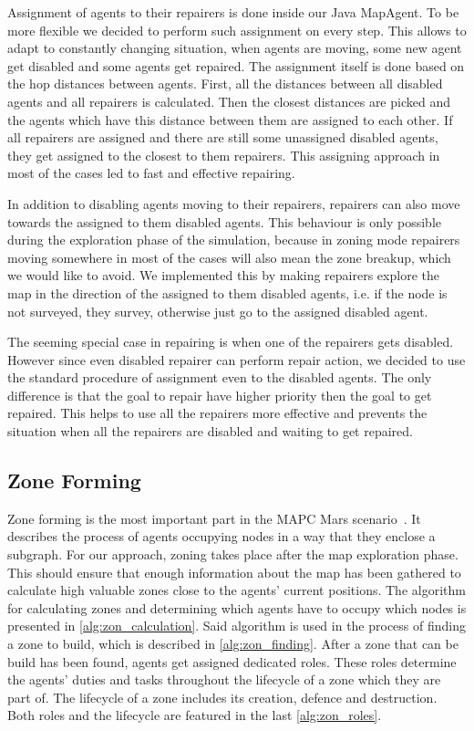 Assignment of agents to their repairers is done inside our Java MapAgent. To be more flexible we decided to perform such assignment on every step. This allows to adapt to constantly changing situation, when agents are moving, some new agent get disabled and some agents get repaired. The assignment itself is done based on the hop distances between agents. First, all the distances between all disabled agents and all repairers is calculated. Then the closest distances are picked and the agents which have this distance between them are assigned to each other. If all repairers are assigned and there are still some unassigned disabled agents, they get assigned to the closest to them repairers. This assigning approach in most of the cases led to fast and effective repairing.

In addition to disabling agents moving to their repairers, repairers can also move towards the assigned to them disabled agents. This behaviour is only possible during the exploration phase of the simulation, because in zoning mode repairers moving somewhere in most of the cases will also mean the zone breakup, which we would like to avoid. We implemented this by making repairers explore the map in the direction of the assigned to them disabled agents, i.e. if the node is not surveyed, they survey, otherwise just go to the assigned disabled agent.

The seeming special case in repairing is when one of the repairers gets disabled. However since even disabled repairer can perform repair action, we decided to use the standard procedure of assignment even to the disabled agents. The only difference is that the goal to repair have higher priority then the goal to get repaired. This helps to use all the repairers more effective and prevents the situation when all the repairers are disabled and waiting to get repaired.

\subsection[Zone Forming]{Zone Forming}
Zone forming is the most important part in the MAPC Mars scenario~\cite{ahlbrecht_mapc_2014}.%
It describes the process of agents occupying nodes in a way that they enclose a subgraph. For our approach, zoning takes place after the map exploration phase. This should ensure that enough information about the map has been gathered to calculate high valuable zones close to the agents' current positions. The algorithm for calculating zones and determining which agents have to occupy which nodes is presented in \autoref{alg:zon_calculation}.
Said algorithm is used in the process of finding a zone to build, which is described in \autoref{alg:zon_finding}. After a zone that can be build has been found, agents get assigned dedicated roles. These roles determine the agents' duties and tasks throughout the lifecycle of a zone which they are part of. The lifecycle of a zone includes its creation, defence and destruction. Both roles and the lifecycle are featured in the last \autoref{alg:zon_roles}.




